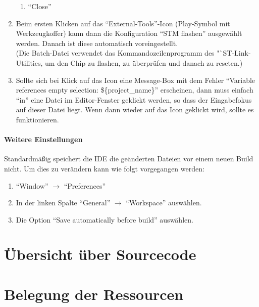 \begin{enumerate}
\begin{enumerate}
			\item "`Close"'
		\end{enumerate}
	\item Beim ersten Klicken auf das "`External-Tools"'-Icon (Play-Symbol mit Werkzeugkoffer) kann dann die Konfiguration "`STM flashen"' ausgewählt werden. Danach ist diese automatisch voreingestellt.\\(Die Batch-Datei verwendet das Kommandozeilenprogramm des "`ST-Link-Utilities, um den Chip zu flashen, zu überprüfen und danach zu reseten.)
	\item Sollte sich bei Klick auf das Icon eine Message-Box mit dem Fehler "`Variable references empty selection: \$\{project\_name\}"' erscheinen, dann muss einfach "`in"' eine Datei im Editor-Fenster geklickt werden, so dass der Eingabefokus auf dieser Datei liegt. Wenn dann wieder auf das Icon geklickt wird, sollte es funktionieren.
\end{enumerate}


\paragraph{Weitere Einstellungen}

Standardmäßig speichert die IDE die geänderten Dateien vor einem neuen Build nicht. Um dies zu verändern kann wie folgt vorgegangen werden:
\begin{enumerate}
	\item "`Window"' $\to$ "`Preferences"'
	\item In der linken Spalte "`General"' $\to$ "`Workspace"' auswählen.
	\item Die Option "`Save automatically before build"' auswählen.
\end{enumerate}


\section{Übersicht über Sourcecode}


\section{Belegung der Ressourcen}


